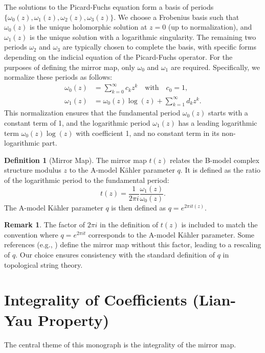 \documentclass{book}
\newcommand{\omegaf}{\omega_0} %
\newcommand{\omegal}{\omega_1} %
\newcommand{\qexp}{q} %
\newcommand{\zmod}{z} %
\newcommand{\tmap}{t} %
\theoremstyle{definition}
\newtheorem{definition}[theorem]{Definition}
\newtheorem{remark}[theorem]{Remark}
\begin{document}
The solutions to the Picard-Fuchs equation form a basis of periods $\{\omega_0(\zmod), \omega_1(\zmod), \omega_2(\zmod), \omega_3(\zmod)\}$. We choose a Frobenius basis such that $\omega_0(\zmod)$ is the unique holomorphic solution at $\zmod=0$ (up to normalization), and $\omega_1(\zmod)$ is the unique solution with a logarithmic singularity. The remaining two periods $\omega_2$ and $\omega_3$ are typically chosen to complete the basis, with specific forms depending on the indicial equation of the Picard-Fuchs operator. For the purposes of defining the mirror map, only $\omegaf$ and $\omegal$ are required. Specifically, we normalize these periods as follows:
\begin{align*}
\omegaf(\zmod) &= \sum_{k=0}^\infty c_k \zmod^k \quad \text{with} \quad c_0 = 1, \\
\omegal(\zmod) &= \omegaf(\zmod) \log(\zmod) + \sum_{k=1}^\infty d_k \zmod^k.
\end{align*}
This normalization ensures that the fundamental period $\omegaf(\zmod)$ starts with a constant term of 1, and the logarithmic period $\omegal(\zmod)$ has a leading logarithmic term $\omegaf(\zmod)\log(\zmod)$ with coefficient 1, and no constant term in its non-logarithmic part.

\begin{definition}[Mirror Map]
The mirror map $\tmap(\zmod)$ relates the B-model complex structure modulus $\zmod$ to the A-model K\"ahler parameter $\qexp$. It is defined as the ratio of the logarithmic period to the fundamental period:
\[
\tmap(\zmod) = \frac{1}{2\pi i} \frac{\omegal(\zmod)}{\omegaf(\zmod)}.
\]
The A-model K\"ahler parameter $\qexp$ is then defined as $\qexp = e^{2\pi i \tmap(\zmod)}$.
\end{definition}

\begin{remark}
\label{rem:2pii_factor}
The factor of $2\pi i$ in the definition of $\tmap(\zmod)$ is included to match the convention where $\qexp = e^{2\pi i \tmap}$ corresponds to the A-model K\"ahler parameter. Some references (e.g., \cite{LianYau1997}) define the mirror map without this factor, leading to a rescaling of $\qexp$. Our choice ensures consistency with the standard definition of $\qexp$ in topological string theory.
\end{remark}

\section{Integrality of Coefficients (Lian-Yau Property)}
The central theme of this monograph is the integrality of the mirror map.
\end{document}

